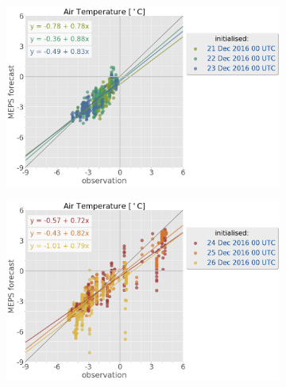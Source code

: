 \begin{figure}\ContinuedFloat
	\centering
	\begin{subfigure}[b]{0.49\textwidth}
		\includegraphics[trim={0.cm 0cm 12.5cm 0cm},clip,
		width=\textwidth]{./fig_sfc_temp/obs_model_20161221_23_00}
		\caption{}\label{fig:scat:temp2123}
	\end{subfigure}
	\begin{subfigure}[b]{0.49\textwidth}
		\includegraphics[trim={0.cm 0cm 12.5cm 0cm},clip,
		width=\textwidth]{./fig_sfc_temp/obs_model_20161224_26_00}
		\caption{}\label{fig:scat:temp2426}
	\end{subfigure}

\end{figure}
